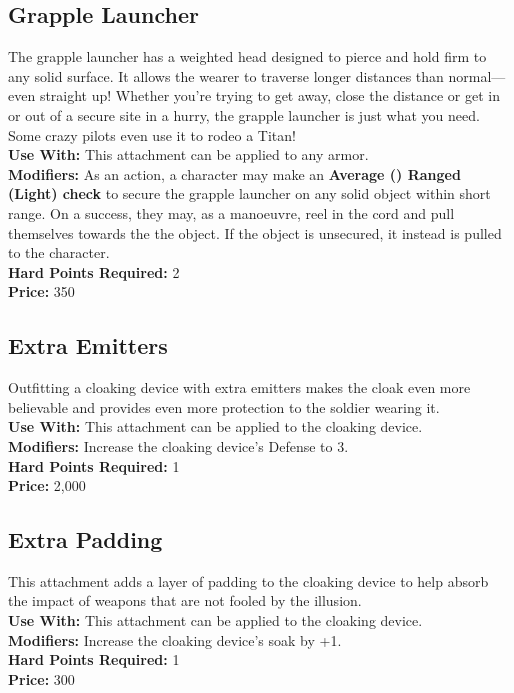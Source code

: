 \subsection{Grapple Launcher}
The grapple launcher has a weighted head designed to pierce and hold firm to any solid surface. It allows the wearer to traverse longer distances than normal---even straight up! Whether you're trying to get away, close the distance or get in or out of a secure site in a hurry, the grapple launcher is just what you need. Some crazy pilots even use it to rodeo a Titan!\\
\noindent\textbf{Use With:} This attachment can be applied to any armor.\\
\noindent\textbf{Modifiers:} As an action, a character may make an \textbf{Average (\DifficultyDie\DifficultyDie) Ranged (Light) check} to secure the grapple launcher on any solid object within short range. On a success, they may, as a manoeuvre, reel in the cord and pull themselves towards the the object. If the object is unsecured, it instead is pulled to the character. \\
\noindent\textbf{Hard Points Required:} 2\\
\noindent\textbf{Price:} 350

\subsection{Extra Emitters}
Outfitting a cloaking device with extra emitters makes the cloak even more believable and provides even more protection to the soldier wearing it.\\
\noindent\textbf{Use With:} This attachment can be applied to the cloaking device.\\
\noindent\textbf{Modifiers:} Increase the cloaking device's Defense to 3.\\
\noindent\textbf{Hard Points Required:} 1\\
\noindent\textbf{Price:} 2,000

\subsection{Extra Padding}
This attachment adds a layer of padding to the cloaking device to help absorb the impact of weapons that are not fooled by the illusion.\\
\noindent\textbf{Use With:} This attachment can be applied to the cloaking device.\\
\noindent\textbf{Modifiers:} Increase the cloaking device's soak by +1.\\
\noindent\textbf{Hard Points Required:} 1\\
\noindent\textbf{Price:} 300


